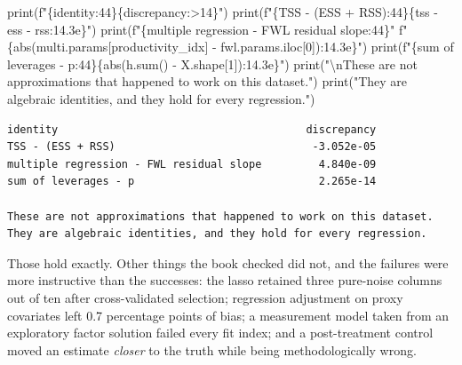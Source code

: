 \documentclass[
  letterpaper,
  10pt,
  twoside,
  openright,
  numbers=noenddot,
  chapterprefix=true]{scrbook}
\newenvironment{Shaded}{}{}
\newcommand{\BuiltInTok}[1]{\textcolor[rgb]{0.84,0.23,0.29}{#1}}
\newcommand{\CharTok}[1]{\textcolor[rgb]{0.01,0.18,0.38}{#1}}
\newcommand{\DecValTok}[1]{\textcolor[rgb]{0.00,0.36,0.77}{#1}}
\newcommand{\NormalTok}[1]{\textcolor[rgb]{0.14,0.16,0.18}{#1}}
\newcommand{\OperatorTok}[1]{\textcolor[rgb]{0.14,0.16,0.18}{#1}}
\newcommand{\SpecialCharTok}[1]{\textcolor[rgb]{0.00,0.36,0.77}{#1}}
\newcommand{\SpecialStringTok}[1]{\textcolor[rgb]{0.01,0.18,0.38}{#1}}
\newcommand{\StringTok}[1]{\textcolor[rgb]{0.01,0.18,0.38}{#1}}
\begin{document}
\begin{Shaded}
\begin{Highlighting}[]
\BuiltInTok{print}\NormalTok{(}\SpecialStringTok{f"}\SpecialCharTok{\{}\StringTok{\textquotesingle{}identity\textquotesingle{}}\SpecialCharTok{:44\}\{}\StringTok{\textquotesingle{}discrepancy\textquotesingle{}}\SpecialCharTok{:\textgreater{}14\}}\SpecialStringTok{"}\NormalTok{)}
\BuiltInTok{print}\NormalTok{(}\SpecialStringTok{f"}\SpecialCharTok{\{}\StringTok{\textquotesingle{}TSS {-} (ESS + RSS)\textquotesingle{}}\SpecialCharTok{:44\}\{}\NormalTok{tss }\OperatorTok{{-}}\NormalTok{ ess }\OperatorTok{{-}}\NormalTok{ rss}\SpecialCharTok{:14.3e\}}\SpecialStringTok{"}\NormalTok{)}
\BuiltInTok{print}\NormalTok{(}\SpecialStringTok{f"}\SpecialCharTok{\{}\StringTok{\textquotesingle{}multiple regression {-} FWL residual slope\textquotesingle{}}\SpecialCharTok{:44\}}\SpecialStringTok{"}
      \SpecialStringTok{f"}\SpecialCharTok{\{}\BuiltInTok{abs}\NormalTok{(multi.params[}\StringTok{\textquotesingle{}productivity\_idx\textquotesingle{}}\NormalTok{] }\OperatorTok{{-}}\NormalTok{ fwl.params.iloc[}\DecValTok{0}\NormalTok{])}\SpecialCharTok{:14.3e\}}\SpecialStringTok{"}\NormalTok{)}
\BuiltInTok{print}\NormalTok{(}\SpecialStringTok{f"}\SpecialCharTok{\{}\StringTok{\textquotesingle{}sum of leverages {-} p\textquotesingle{}}\SpecialCharTok{:44\}\{}\BuiltInTok{abs}\NormalTok{(h.}\BuiltInTok{sum}\NormalTok{() }\OperatorTok{{-}}\NormalTok{ X.shape[}\DecValTok{1}\NormalTok{])}\SpecialCharTok{:14.3e\}}\SpecialStringTok{"}\NormalTok{)}
\BuiltInTok{print}\NormalTok{(}\StringTok{"}\CharTok{\textbackslash{}n}\StringTok{These are not approximations that happened to work on this dataset."}\NormalTok{)}
\BuiltInTok{print}\NormalTok{(}\StringTok{"They are algebraic identities, and they hold for every regression."}\NormalTok{)}
\end{Highlighting}
\end{Shaded}

\begin{verbatim}
identity                                       discrepancy
TSS - (ESS + RSS)                               -3.052e-05
multiple regression - FWL residual slope         4.840e-09
sum of leverages - p                             2.265e-14

These are not approximations that happened to work on this dataset.
They are algebraic identities, and they hold for every regression.
\end{verbatim}

Those hold exactly. Other things the book checked did not, and the
failures were more instructive than the successes: the lasso retained
three pure-noise columns out of ten after cross-validated selection;
regression adjustment on proxy covariates left 0.7 percentage points of
bias; a measurement model taken from an exploratory factor solution
failed every fit index; and a post-treatment control moved an estimate
\emph{closer} to the truth while being methodologically wrong.
\end{document}
